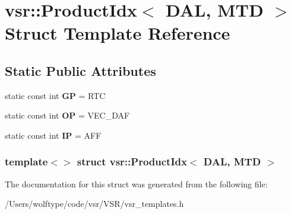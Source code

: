 \hypertarget{structvsr_1_1_product_idx_3_01_d_a_l_00_01_m_t_d_01_4}{\section{vsr\-:\-:Product\-Idx$<$ D\-A\-L, M\-T\-D $>$ Struct Template Reference}
\label{structvsr_1_1_product_idx_3_01_d_a_l_00_01_m_t_d_01_4}
}
\subsection*{Static Public Attributes}
\begin{DoxyCompactItemize}
\item 
\hypertarget{structvsr_1_1_product_idx_3_01_d_a_l_00_01_m_t_d_01_4_ad51732e48b5cdc1ee7002a986169460a}{static const int {\bfseries G\-P} = R\-T\-C}\label{structvsr_1_1_product_idx_3_01_d_a_l_00_01_m_t_d_01_4_ad51732e48b5cdc1ee7002a986169460a}

\item 
\hypertarget{structvsr_1_1_product_idx_3_01_d_a_l_00_01_m_t_d_01_4_aba85622d534db56fe0ddf50388662436}{static const int {\bfseries O\-P} = V\-E\-C\-\_\-\-D\-A\-F}\label{structvsr_1_1_product_idx_3_01_d_a_l_00_01_m_t_d_01_4_aba85622d534db56fe0ddf50388662436}

\item 
\hypertarget{structvsr_1_1_product_idx_3_01_d_a_l_00_01_m_t_d_01_4_a7802a183da4c6f54a43ad0a6992c143e}{static const int {\bfseries I\-P} = A\-F\-F}\label{structvsr_1_1_product_idx_3_01_d_a_l_00_01_m_t_d_01_4_a7802a183da4c6f54a43ad0a6992c143e}

\end{DoxyCompactItemize}
\subsubsection*{template$<$$>$ struct vsr\-::\-Product\-Idx$<$ D\-A\-L, M\-T\-D $>$}



The documentation for this struct was generated from the following file\-:\begin{DoxyCompactItemize}
\item 
/\-Users/wolftype/code/vsr/\-V\-S\-R/vsr\-\_\-templates.\-h\end{DoxyCompactItemize}
